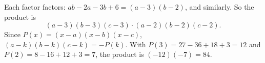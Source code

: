 Each factor factors: $ab-2a-3b+6=(a-3)(b-2)$, and similarly. So the product is
\[(a-3)(b-3)(c-3)\cdot(a-2)(b-2)(c-2).\]
Since $P(x)=(x-a)(x-b)(x-c)$, $(a-k)(b-k)(c-k)=-P(k)$. With $P(3)=27-36+18+3=12$ and $P(2)=8-16+12+3=7$, the product is $(-12)(-7)=\boxed{84}$.
